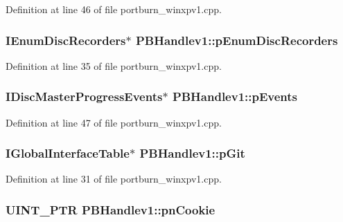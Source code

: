 Definition at line 46 of file portburn\+\_\+winxpv1.\+cpp.

\subsubsection[{\texorpdfstring{p\+Enum\+Disc\+Recorders}{pEnumDiscRecorders}}]{\setlength{\rightskip}{0pt plus 5cm}I\+Enum\+Disc\+Recorders$\ast$ P\+B\+Handlev1\+::p\+Enum\+Disc\+Recorders}\hypertarget{struct_p_b_handlev1_a2e999b1dc623c34d38b3164acdba7258}{}\label{struct_p_b_handlev1_a2e999b1dc623c34d38b3164acdba7258}


Definition at line 35 of file portburn\+\_\+winxpv1.\+cpp.

\subsubsection[{\texorpdfstring{p\+Events}{pEvents}}]{\setlength{\rightskip}{0pt plus 5cm}I\+Disc\+Master\+Progress\+Events$\ast$ P\+B\+Handlev1\+::p\+Events}\hypertarget{struct_p_b_handlev1_a10b80fde92dc500d0f8f51dc5eca0b53}{}\label{struct_p_b_handlev1_a10b80fde92dc500d0f8f51dc5eca0b53}


Definition at line 47 of file portburn\+\_\+winxpv1.\+cpp.

\subsubsection[{\texorpdfstring{p\+Git}{pGit}}]{\setlength{\rightskip}{0pt plus 5cm}I\+Global\+Interface\+Table$\ast$ P\+B\+Handlev1\+::p\+Git}\hypertarget{struct_p_b_handlev1_afcb21d2b76344e54d9240a70759b488c}{}\label{struct_p_b_handlev1_afcb21d2b76344e54d9240a70759b488c}


Definition at line 31 of file portburn\+\_\+winxpv1.\+cpp.

\subsubsection[{\texorpdfstring{pn\+Cookie}{pnCookie}}]{\setlength{\rightskip}{0pt plus 5cm}U\+I\+N\+T\+\_\+\+P\+TR P\+B\+Handlev1\+::pn\+Cookie}\hypertarget{struct_p_b_handlev1_a8400859e34f06cb4b4597039d9ed2463}{}\label{struct_p_b_handlev1_a8400859e34f06cb4b4597039d9ed2463}


